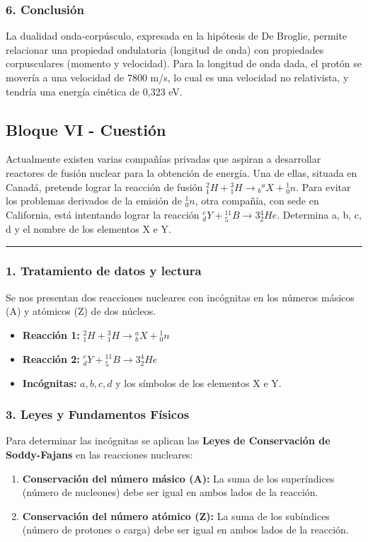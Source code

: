 \subsubsection*{6. Conclusión}
\begin{cajaconclusion}
La dualidad onda-corpúsculo, expresada en la hipótesis de De Broglie, permite relacionar una propiedad ondulatoria (longitud de onda) con propiedades corpusculares (momento y velocidad). Para la longitud de onda dada, el protón se movería a una velocidad de 7800 m/s, lo cual es una velocidad no relativista, y tendría una energía cinética de 0,323 eV.
\end{cajaconclusion}
\newpage

\subsection{Bloque VI - Cuestión}
\label{subsec:A6_2017_jul_ext}

\begin{cajaenunciado}
Actualmente existen varias compañías privadas que aspiran a desarrollar reactores de fusión nuclear para la obtención de energía. Una de ellas, situada en Canadá, pretende lograr la reacción de fusión ${}_{1}^{2}H+{}_{1}^{3}H\rightarrow{_{b}}^{a}X+{}_{0}^{1}n$. Para evitar los problemas derivados de la emisión de ${}_{0}^{1}n$, otra compañía, con sede en California, está intentando lograr la reacción ${}_{d}^{c}Y+{}_{5}^{11}B\rightarrow3{}_{2}^{4}He$. Determina a, b, c, d y el nombre de los elementos X e Y.
\end{cajaenunciado}
\hrule

\subsubsection*{1. Tratamiento de datos y lectura}
Se nos presentan dos reacciones nucleares con incógnitas en los números másicos (A) y atómicos (Z) de dos núcleos.
\begin{itemize}
    \item \textbf{Reacción 1:} ${}_{1}^{2}H+{}_{1}^{3}H \rightarrow {}_{b}^{a}X+{}_{0}^{1}n$
    \item \textbf{Reacción 2:} ${}_{d}^{c}Y+{}_{5}^{11}B \rightarrow 3{}_{2}^{4}He$
    \item \textbf{Incógnitas:} $a, b, c, d$ y los símbolos de los elementos X e Y.
\end{itemize}

\subsubsection*{3. Leyes y Fundamentos Físicos}
Para determinar las incógnitas se aplican las \textbf{Leyes de Conservación de Soddy-Fajans} en las reacciones nucleares:
\begin{enumerate}
    \item \textbf{Conservación del número másico (A):} La suma de los superíndices (número de nucleones) debe ser igual en ambos lados de la reacción.
    \item \textbf{Conservación del número atómico (Z):} La suma de los subíndices (número de protones o carga) debe ser igual en ambos lados de la reacción.
\end{enumerate}

